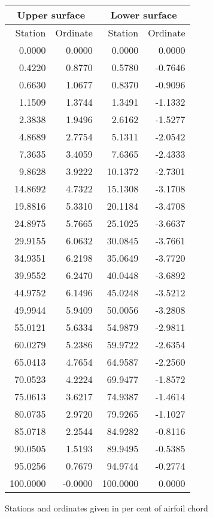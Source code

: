 \documentclass[11pt]{book}
\begin{document}
 \hspace{4mm}
 \begin{tabular}{|r|r|r|r|} \hline 
 \multicolumn{2}{|c|}{Upper surface} & \multicolumn{2}{|c|}{Lower surface} \\
 \hline
 Station & Ordinate & Station & Ordinate \\
 \hline
0.0000 & 0.0000 & 0.0000 & 0.0000 \\
0.4220 & 0.8770 & 0.5780 & -0.7646 \\
0.6630 & 1.0677 & 0.8370 & -0.9096 \\
1.1509 & 1.3744 & 1.3491 & -1.1332 \\
2.3838 & 1.9496 & 2.6162 & -1.5277 \\
4.8689 & 2.7754 & 5.1311 & -2.0542 \\
7.3635 & 3.4059 & 7.6365 & -2.4333 \\
9.8628 & 3.9222 & 10.1372 & -2.7301 \\
14.8692 & 4.7322 & 15.1308 & -3.1708 \\
19.8816 & 5.3310 & 20.1184 & -3.4708 \\
24.8975 & 5.7665 & 25.1025 & -3.6637 \\
29.9155 & 6.0632 & 30.0845 & -3.7661 \\
34.9351 & 6.2198 & 35.0649 & -3.7720 \\
39.9552 & 6.2470 & 40.0448 & -3.6892 \\
44.9752 & 6.1496 & 45.0248 & -3.5212 \\
49.9944 & 5.9409 & 50.0056 & -3.2808 \\
55.0121 & 5.6334 & 54.9879 & -2.9811 \\
60.0279 & 5.2386 & 59.9722 & -2.6354 \\
65.0413 & 4.7654 & 64.9587 & -2.2560 \\
70.0523 & 4.2224 & 69.9477 & -1.8572 \\
75.0613 & 3.6217 & 74.9387 & -1.4614 \\
80.0735 & 2.9720 & 79.9265 & -1.1027 \\
85.0718 & 2.2544 & 84.9282 & -0.8116 \\
90.0505 & 1.5193 & 89.9495 & -0.5385 \\
95.0256 & 0.7679 & 94.9744 & -0.2774 \\
100.0000 & -0.0000 & 100.0000 & 0.0000 \\
 \hline 
 \end{tabular}
 \vspace{8mm}

Stations and ordinates given in per cent of airfoil chord
\end{document}
